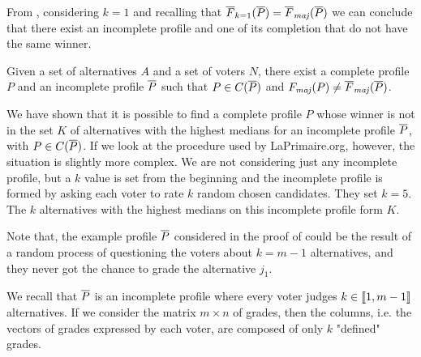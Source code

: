 	From , considering $k=1$ and recalling that $\overline{F}_{k=1}(\Pbar) = \Fmajbar(\Pbar)$ we can conclude that there exist an incomplete profile and one of its completion that do not have the same winner.
	\begin{remark}
		Given a set of alternatives $A$ and a set of voters $N$, there exist a complete profile $P$ and an incomplete profile $\overline{P}$ such that $P \in C(\overline{P})$ and $\Fmaj(P) \neq \Fmajbar(\Pbar)$.
	\end{remark}

	
	We have shown that it is possible to find a complete profile $P$ whose winner is not in the set $K$ of alternatives with the highest medians for an incomplete profile $\overline{P}$, with $P \in C(\overline{P})$.
	If we look at the procedure used by LaPrimaire.org, however, the situation is slightly more complex. We are not considering just any incomplete profile, but a $k$ value is set from the beginning and the incomplete profile is formed by asking each voter to rate $k$ random chosen candidates. They set $k=5$.
	The $k$ alternatives with the highest medians on this incomplete profile form $K$.
	
	Note that, the example profile $\overline{P}$ considered in the proof of  could be the result of a random process of questioning the voters about $k=m-1$ alternatives, and they never got the chance to grade the alternative $j_1$.
	
	We recall that $\overline{P}$ is an incomplete profile where every voter judges $k\in \llbracket1,m-1\rrbracket$ alternatives. If we consider the matrix $m \times n$ of grades, then the columns, i.e. the vectors of grades expressed by each voter, are composed of only $k$ "defined" grades.
	
